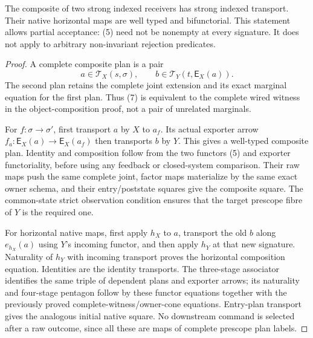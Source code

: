 \documentclass[11pt]{article}\usepackage{amsmath,amssymb,amsthm,geometry}\geometry{margin=1in}
\begin{document}
\begin{theorem}
The composite of two strong indexed receivers has strong indexed transport. Their native horizontal maps are well typed and bifunctorial. This statement allows partial acceptance: (5) need not be nonempty at every signature. It does not apply to arbitrary non-invariant rejection predicates.
\end{theorem}
\begin{proof}
A complete composite plan is a pair
\[
 a\in\mathcal T_X(s,\sigma),\qquad
 b\in\mathcal T_Y(t,\mathsf E_X(a)).                    \tag{7}
\]
The second plan retains the complete joint extension and its exact marginal equation for the first plan. Thus (7) is equivalent to the complete wired witness in the object-composition proof, not a pair of unrelated marginals.

For $f:\sigma\to\sigma'$, first transport $a$ by $X$ to $a_f$. Its actual exporter arrow $f_a:\mathsf E_X(a)\to\mathsf E_X(a_f)$ then transports $b$ by $Y$. This gives a well-typed composite plan. Identity and composition follow from the two functors (5) and exporter functoriality, before using any feedback or closed-system comparison. Their raw maps push the same complete joint, factor maps materialize by the same exact owner schema, and their entry/poststate squares give the composite square. The common-state strict observation condition ensures that the target prescope fibre of $Y$ is the required one.

For horizontal native maps, first apply $h_X$ to $a$, transport the old $b$ along $e_{h_X}(a)$ using $Y$'s incoming functor, and then apply $h_Y$ at that new signature. Naturality of $h_Y$ with incoming transport proves the horizontal composition equation. Identities are the identity transports. The three-stage associator identifies the same triple of dependent plans and exporter arrows; its naturality and four-stage pentagon follow by these functor equations together with the previously proved complete-witness/owner-cone equations. Entry-plan transport gives the analogous initial native square. No downstream command is selected after a raw outcome, since all these are maps of complete prescope plan labels.\end{proof}
\end{document}
